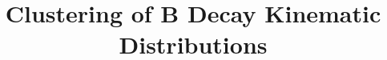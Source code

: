 \newif\ifhandout
\newif\ifreducedcontent
%
\handoutfalse
\reducedcontenttrue
%










\usepackage[outputdir=build]{minted}


%
\title{Clustering of B Decay Kinematic Distributions}

%






